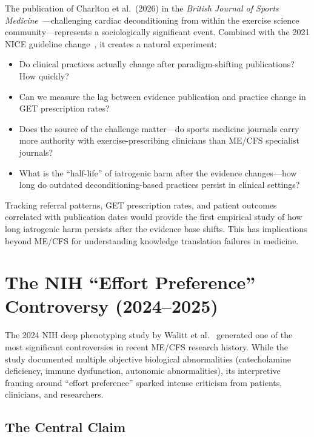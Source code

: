 \begin{open_question}
\label{oq:paradigm-shift-natural-experiment}
The publication of Charlton et al.\ (2026) in the \textit{British Journal of Sports Medicine}~\cite{Charlton2026pem}---challenging cardiac deconditioning from within the exercise science community---represents a sociologically significant event. Combined with the 2021 NICE guideline change~\cite{NICE2021mecfs}, it creates a natural experiment:

\begin{itemize}
    \item Do clinical practices actually change after paradigm-shifting publications? How quickly?
    \item Can we measure the lag between evidence publication and practice change in GET prescription rates?
    \item Does the source of the challenge matter---do sports medicine journals carry more authority with exercise-prescribing clinicians than ME/CFS specialist journals?
    \item What is the ``half-life'' of iatrogenic harm after the evidence changes---how long do outdated deconditioning-based practices persist in clinical settings?
\end{itemize}

Tracking referral patterns, GET prescription rates, and patient outcomes correlated with publication dates would provide the first empirical study of how long iatrogenic harm persists after the evidence base shifts. This has implications beyond ME/CFS for understanding knowledge translation failures in medicine.
\end{open_question}

\section{The NIH ``Effort Preference'' Controversy (2024--2025)}
\label{sec:effort-preference-debate}

The 2024 NIH deep phenotyping study by Walitt et al.~\cite{walitt2024deep} generated one of the most significant controversies in recent ME/CFS research history. While the study documented multiple objective biological abnormalities (catecholamine deficiency, immune dysfunction, autonomic abnormalities), its interpretive framing around ``effort preference'' sparked intense criticism from patients, clinicians, and researchers.

\subsection{The Central Claim}


